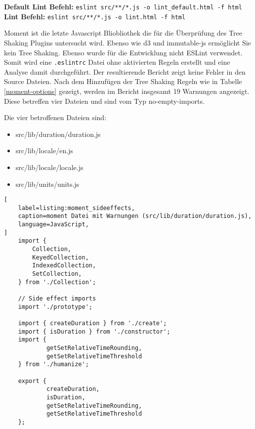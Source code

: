 \begin{center}
\textbf{Default Lint Befehl:} \lstinline{eslint src/**/*.js -o lint_default.html -f html}\linebreak 
\textbf{Lint Befehl:} \lstinline{eslint src/**/*.js -o lint.html -f html}
\end{center}

Moment ist die letzte Javascript Bliobliothek die für die Überprüfung des Tree Shaking Plugins untersucht wird. Ebenso wie d3 und immutable-js ermöglicht Sie kein Tree Shaking. Ebenso wurde für die Entwicklung nicht ESLint verwendet. Somit wird eine \lstinline{.eslintrc} Datei ohne aktivierten Regeln erstellt und eine Analyse damit durchgeführt. Der resultierende Bericht zeigt keine Fehler  in den Source Dateien. Nach dem Hinzufügen der Tree Shaking Regeln wie in Tabelle \ref{moment-options} gezeigt, werden im Bericht insgesamt 19 Warnungen angezeigt. Diese betreffen vier Dateien und sind vom Typ no-empty-imports.

Die vier betroffenen Dateien sind:
\begin{itemize}
\item src/lib/duration/duration.js
\item src/lib/locale/en.js
\item src/lib/locale/locale.js
\item src/lib/units/units.js
\end{itemize}

\begin{lstlisting}[
    label=listing:moment_sideeffects,
	caption=moment Datei mit Warnungen (src/lib/duration/duration.js),
	language=JavaScript,
]
	import {
		Collection,
		KeyedCollection,
		IndexedCollection,
		SetCollection,
	} from './Collection';

	// Side effect imports
	import './prototype';

	import { createDuration } from './create';
	import { isDuration } from './constructor';
	import {
    		getSetRelativeTimeRounding,
    		getSetRelativeTimeThreshold
	} from './humanize';

	export {
    		createDuration,
    		isDuration,
    		getSetRelativeTimeRounding,
    		getSetRelativeTimeThreshold
	};
\end{lstlisting}

